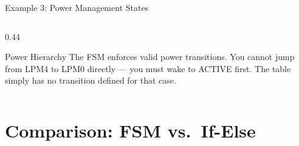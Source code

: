 \documentclass[aspectratio=169, 10pt]{beamer}
\begin{document}
\begin{frame}[fragile]{Example 3: Power Management States}
\begin{columns}[T]
\begin{column}{0.44\textwidth}
\begin{center}
\end{center}

\vspace{0.3em}
\begin{block}{Power Hierarchy}
The FSM enforces valid power transitions.
You cannot jump from LPM4 to LPM0 directly ---
you must wake to ACTIVE first. The table
simply has no transition defined for that case.
\end{block}
\end{column}
\end{columns}
\end{frame}

\section{Comparison: FSM vs.\ If-Else}
\end{document}
